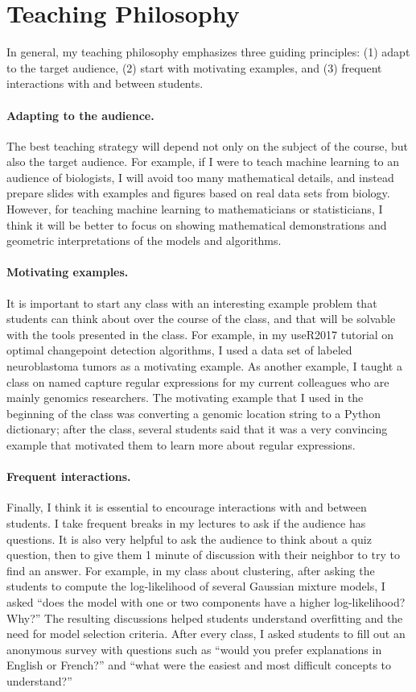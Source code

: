 \documentclass{article}
\begin{document}
\section{Teaching Philosophy}

In general, my teaching philosophy emphasizes three guiding
principles: (1) adapt to the target audience, (2) start with
motivating examples, and (3) frequent interactions with and between
students.

\paragraph{Adapting to the audience.} The best teaching strategy will
depend not only on the subject of the course, but also the target
audience. For example, if I were to teach machine learning to an
audience of biologists, I will avoid too many mathematical details,
and instead prepare slides with examples and figures based on real
data sets from biology. However, for teaching machine learning to
mathematicians or statisticians, I think it will be better to focus on
showing mathematical demonstrations and geometric interpretations of
the models and algorithms.

\paragraph{Motivating examples.} It is important to start any class
with an interesting example problem that students can think about over
the course of the class, and that will be solvable with the tools
presented in the class. For example, in my useR2017 tutorial on
optimal changepoint detection algorithms, I used a data set of labeled
neuroblastoma tumors as a motivating example. As another example, I
taught a class on named capture regular expressions for my current
colleagues who are mainly genomics researchers. The motivating example
that I used in the beginning of the class was converting a genomic
location string to a Python dictionary; after the class, several
students said that it was a very convincing example that motivated
them to learn more about regular expressions.

\paragraph{Frequent interactions.} Finally, I think it is essential to
encourage interactions with and between students. I take frequent
breaks in my lectures to ask if the audience has questions. It is also
very helpful to ask the audience to think about a quiz question, then
to give them 1 minute of discussion with their neighbor to try to find
an answer. For example, in my class about clustering, after asking the
students to compute the log-likelihood of several Gaussian mixture
models, I asked ``does the model with one or two components have a higher
log-likelihood? Why?'' The resulting discussions helped students
understand overfitting and the need for model selection
criteria. After every class, I asked students to fill out an anonymous
survey with questions such as ``would you prefer explanations in
English or French?'' and ``what were the easiest and most difficult
concepts to understand?''
\end{document}
